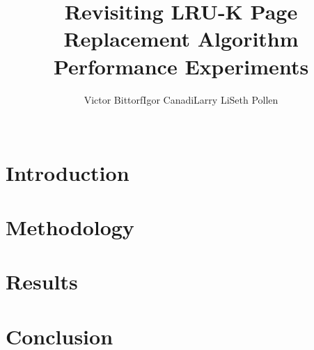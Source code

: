 \documentclass{sig-alternate}
\begin{document}
\title{Revisiting LRU-K Page Replacement Algorithm Performance Experiments}

\author{
	\alignauthor Victor Bittorf\qquad Igor Canadi\qquad Larry Li\qquad Seth Pollen\\
	\\
}

\maketitle



\section{Introduction}
\label{sec:intro}


\section{Methodology}
\label{sec:method}


\section{Results}
\label{sec:results}


\section{Conclusion}
\label{sec:conc}

\end{document}
